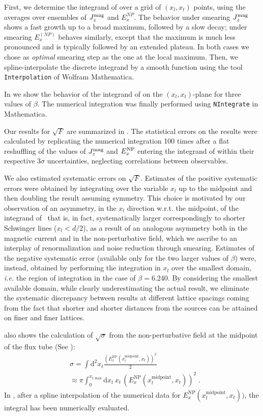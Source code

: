 \documentclass[pdftex,twocolumn,epjc3,envcountsect]{svjour3}
\begin{document}
First, we determine the integrand  of  over a grid of $(x_l,x_t)$ points, using the averages over ensembles of $J^{\rm mag}_z$ and $E_x^{{NP}}$. The behavior under smearing $J^{\rm mag}_z$
shows a fast growth up to a broad maximum, followed by a slow decay; under smearing $E_x^{(NP)}$
behaves similarly, except that the maximum is much less pronounced and is typically followed by an extended plateau. In both cases we chose as {\em optimal} smearing step as the one at the local maximum. Then, we spline-interpolate the discrete integrand by a smooth function using the tool {\tt Interpolation} of Wolfram Mathematica.

In  we show the behavior of the integrand of  on the $(x_l,x_t)$-plane for three values of $\beta$. The numerical integration was finally performed using {\tt NIntegrate} in Mathematica.

Our results for  $\sqrt{F}$ are summarized in . The statistical errors on the results were calculated by replicating the numerical integration 100 times after a flat reshuffling of the values of $J^{\rm mag}_z$ and $E_x^{\rm NP}$ entering the integrand of  within their respective 3$\sigma$ uncertainties, neglecting correlations between observables.

We also  estimated systematic errors on $\sqrt{F}$. Estimates of the positive systematic errors  were obtained by integrating over the variable $x_l$ up to the midpoint and then doubling the result assuming symmetry. This choice is motivated by our observation of an asymmetry, in the $x_l$ direction w.r.t. the midpoint, of the integrand of~ that is, in fact, systematically larger correspondingly to shorter Schwinger lines ($x_l<d/2$), as a result of an analogous asymmetry both in the magnetic current and in the non-perturbative field, which we ascribe to an interplay of renormalization and noise reduction through smearing.  Estimates of the negative systematic error (available only for the two larger values of $\beta$) were, instead, obtained by performing the integration in $x_l$ over the smallest domain, {\em i.e.} the region of integration in the case of $\beta=6.240$. By considering the smallest available domain, while clearly underestimating the actual result, we eliminate the systematic discrepancy between results at different lattice spacings coming from the fact that shorter and shorter distances from the sources can be attained on finer and finer lattices.

 also shows the calculation of $\sqrt{\sigma}$  from the non-perturbative field at the midpoint of the flux tube (See ):
\begin{align}
&\sigma =  \int \mathrm{d}^2x_t 
  \frac{(E^{\mathrm{NP}}_x (x_l^{\mathrm{midpoint}},x_t))^2}{2}  \nonumber \\ &\approx \pi \int_0^{x_{t,\mathrm{max}}} \mathrm{d}x_t \, x_t \, (E^{\mathrm{NP}}_x (x_l^{\mathrm{midpoint}},x_t))^2 \;.
 \label{eq:stringtension}
 \end{align}
%
In , after a spline interpolation of the numerical data for 
$E^{\mathrm{NP}}_x (x_l^{\mathrm{midpoint}},x_t))$, the integral has been numerically evaluated.
 
\end{document}
